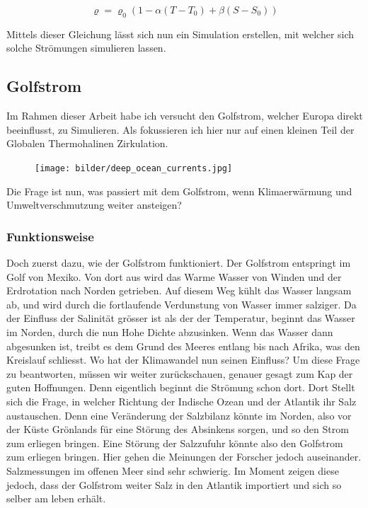 \begin{equation}
\varrho
=
\varrho_0(1-\alpha(T-T_0)+\beta(S-S_0))
\label{skript:salinity-linear}
\end{equation} 

Mittels dieser Gleichung lässt sich nun ein Simulation erstellen, mit welcher sich solche Strömungen simulieren lassen.

\subsection{Golfstrom}

Im Rahmen dieser Arbeit habe ich versucht den Golfstrom, welcher Europa direkt beeinflusst, zu Simulieren.
Als fokussieren ich hier nur auf einen kleinen Teil der Globalen Thermohalinen Zirkulation.


\begin{figure}
	\texttt{[image: bilder/deep\_ocean\_currents.jpg]}
\end{figure}

Die Frage ist nun, was passiert mit dem Golfstrom, wenn Klimaerwärmung und Umweltverschmutzung weiter ansteigen?

\subsubsection{Funktionsweise}

Doch zuerst dazu, wie der Golfstrom funktioniert.
Der Golfstrom entspringt im Golf von Mexiko. Von dort aus wird das Warme Wasser von Winden und der Erdrotation nach Norden getrieben.
Auf diesem Weg kühlt das Wasser langsam ab, und wird durch die fortlaufende Verdunstung von Wasser immer salziger. Da der Einfluss der Salinität grösser ist als der der Temperatur, beginnt das Wasser im Norden, durch die nun Hohe Dichte abzusinken. Wenn das Wasser dann abgesunken ist, treibt es dem Grund des Meeres entlang bis nach Afrika, was den Kreislauf schliesst.
Wo hat der Klimawandel nun seinen Einfluss?
Um diese Frage zu beantworten, müssen wir weiter zurückschauen, genauer gesagt zum Kap der guten Hoffnungen. Denn eigentlich beginnt die Strömung schon dort. 
Dort Stellt sich die Frage, in welcher Richtung der Indische Ozean und der Atlantik ihr Salz austauschen. 
Denn eine Veränderung der Salzbilanz könnte im Norden, also vor der Küste Grönlands für eine Störung des Absinkens sorgen, und so den Strom zum erliegen bringen. 
Eine Störung der Salzzufuhr könnte also den Golfstrom zum erliegen bringen.
Hier gehen die Meinungen der Forscher jedoch auseinander. Salzmessungen im offenen Meer sind sehr schwierig. 
Im Moment zeigen diese jedoch, dass der Golfstrom weiter Salz in den Atlantik importiert und sich so selber am leben erhält.

